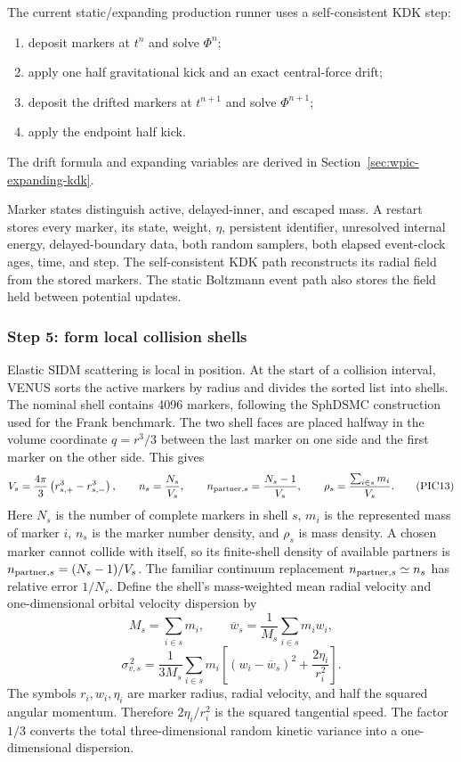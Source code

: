 The current static/expanding production runner uses a self-consistent KDK
step:
\begin{enumerate}
\item deposit markers at \(t^n\) and solve \(\Phi^n\);
\item apply one half gravitational kick and an exact central-force drift;
\item deposit the drifted markers at \(t^{n+1}\) and solve \(\Phi^{n+1}\);
\item apply the endpoint half kick.
\end{enumerate}
The drift formula and expanding variables are derived in
Section~\ref{sec:wpic-expanding-kdk}.

Marker states distinguish active, delayed-inner, and escaped mass.  A restart
stores every marker, its state, weight, \(\eta\), persistent identifier,
unresolved internal energy, delayed-boundary data, both random samplers, both
elapsed event-clock ages, time, and step. The self-consistent KDK path
reconstructs its radial field from the stored markers. The static Boltzmann
event path also stores the field held between potential updates.

\subsubsection{Step 5: form local collision shells}

Elastic SIDM scattering is local in position.  At the start of a collision
interval, VENUS sorts the active markers by radius and divides the sorted list
into shells.  The nominal shell contains 4096 markers, following the SphDSMC
construction used for the Frank benchmark.  The two shell faces are placed
halfway in the volume coordinate \(q=r^3/3\) between the last marker on one
side and the first marker on the other side.  This gives
\[
 V_s=\frac{4\pi}{3}\left(r_{s,+}^3-r_{s,-}^3\right),
 \qquad
 n_s=\frac{N_s}{V_s},\qquad
 n_{{\rm partner},s}=\frac{N_s-1}{V_s},\qquad
 \rho_s=\frac{\sum_{i\in s}m_i}{V_s}.                   \tag{PIC13}
\]
Here \(N_s\) is the number of complete markers in shell \(s\), \(m_i\) is the
represented mass of marker \(i\), \(n_s\) is the marker number density, and
\(\rho_s\) is mass density.  A chosen marker cannot collide with itself, so
its finite-shell density of available partners is
\(n_{{\rm partner},s}=(N_s-1)/V_s\).  The familiar continuum replacement
\(n_{{\rm partner},s}\simeq n_s\) has relative error \(1/N_s\).  Define the
shell's mass-weighted mean radial velocity and one-dimensional orbital
velocity dispersion by
\[
 M_s=\sum_{i\in s}m_i,\qquad
 \overline w_s=\frac{1}{M_s}\sum_{i\in s}m_iw_i,        \tag{PIC14a}
\]
\[
 \sigma_{v,s}^{\,2}=\frac{1}{3M_s}
 \sum_{i\in s}m_i\left[
   (w_i-\overline w_s)^2+\frac{2\eta_i}{r_i^2}
 \right].                                               \tag{PIC14b}
\]
The symbols \(r_i,w_i,\eta_i\) are marker radius, radial velocity, and half
the squared angular momentum.  Therefore \(2\eta_i/r_i^2\) is the squared
tangential speed.  The factor \(1/3\) converts the total three-dimensional
random kinetic variance into a one-dimensional dispersion.

